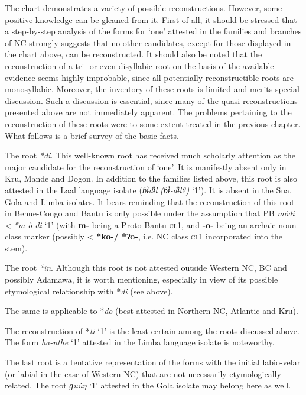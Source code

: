 The chart demonstrates a variety of possible reconstructions. However, some positive knowledge can be gleaned from it. First of all, it should be stressed that a step-by-step analysis of the forms for ‘one’ attested in the families and branches of NC strongly suggests that no other candidates, except for those displayed in the chart above, can be reconstructed. It should also be noted that the reconstruction of a tri- or even disyllabic root on the basis of the available evidence seems highly improbable, since all potentially reconstructible roots are monosyllabic. Moreover, the inventory of these roots is limited and merits special discussion. Such a discussion is essential, since many of the quasi-reconstructions presented above are not immediately apparent. The problems pertaining to the reconstruction of these roots were to some extent treated in the previous chapter. What follows is a brief survey of the basic facts.

The root \textit{*di}. This well-known root has received much scholarly attention as the major candidate for the reconstruction of ‘one’. It is manifestly absent only in Kru, Mande and Dogon. In addition to the families listed above, this root is also attested in the Laal language isolate (\textit{ɓ{\`{ɨ}}d{\'{ɨ}}l} \textit{(ɓ{\`{ɨ}}-d{\'{ɨ}}l?)} ‘1’). It is absent in the Sua, Gola and Limba isolates. It bears reminding that the reconstruction of this root in Benue-Congo and Bantu is only possible under the assumption that PB \textit{mòdì} \textit{<} \textit{*m-ò-dì} ‘1’ (with \textbf{m-} being a Proto-Bantu \textsc{cl}1, and \textbf{-}\textbf{o-} being an archaic noun class marker (possibly < \textbf{*ko}\textbf{-/ *ʔ}\textbf{o-}, i.e. NC class \textsc{cl}1 incorporated into the stem).

The root \textit{*in}. Although this root is not attested outside Western NC, BC and possibly Adamawa, it is worth mentioning, especially in view of its possible etymological relationship with *\textit{di} (see above).

The same is applicable to *\textit{do} (best attested in Northern NC, Atlantic and Kru).

The reconstruction of *\textit{ti} ‘1’ is the least certain among the roots discussed above. The form \textit{ha-nthe} ‘1’ attested in the Limba language isolate is noteworthy.

The last root is a tentative representation of the forms with the initial labio-velar (or labial in the case of Western NC) that are not necessarily etymologically related. The root \textit{ɡu{\`{u}}ŋ} ‘1’ attested in the Gola isolate may belong here as well. 

